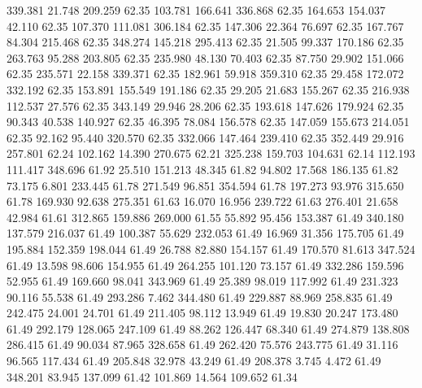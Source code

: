  339.381   21.748  209.259        62.35
 103.781  166.641  336.868        62.35
 164.653  154.037   42.110        62.35
 107.370  111.081  306.184        62.35
 147.306   22.364   76.697        62.35
 167.767   84.304  215.468        62.35
 348.274  145.218  295.413        62.35
  21.505   99.337  170.186        62.35
 263.763   95.288  203.805        62.35
 235.980   48.130   70.403        62.35
  87.750   29.902  151.066        62.35
 235.571   22.158  339.371        62.35
 182.961   59.918  359.310        62.35
  29.458  172.072  332.192        62.35
 153.891  155.549  191.186        62.35
  29.205   21.683  155.267        62.35
 216.938  112.537   27.576        62.35
 343.149   29.946   28.206        62.35
 193.618  147.626  179.924        62.35
  90.343   40.538  140.927        62.35
  46.395   78.084  156.578        62.35
 147.059  155.673  214.051        62.35
  92.162   95.440  320.570        62.35
 332.066  147.464  239.410        62.35
 352.449   29.916  257.801        62.24
 102.162   14.390  270.675        62.21
 325.238  159.703  104.631        62.14
 112.193  111.417  348.696        61.92
  25.510  151.213   48.345        61.82
  94.802   17.568  186.135        61.82
  73.175    6.801  233.445        61.78
 271.549   96.851  354.594        61.78
 197.273   93.976  315.650        61.78
 169.930   92.638  275.351        61.63
  16.070   16.956  239.722        61.63
 276.401   21.658   42.984        61.61
 312.865  159.886  269.000        61.55
  55.892   95.456  153.387        61.49
 340.180  137.579  216.037        61.49
 100.387   55.629  232.053        61.49
  16.969   31.356  175.705        61.49
 195.884  152.359  198.044        61.49
  26.788   82.880  154.157        61.49
 170.570   81.613  347.524        61.49
  13.598   98.606  154.955        61.49
 264.255  101.120   73.157        61.49
 332.286  159.596   52.955        61.49
 169.660   98.041  343.969        61.49
  25.389   98.019  117.992        61.49
 231.323   90.116   55.538        61.49
 293.286    7.462  344.480        61.49
 229.887   88.969  258.835        61.49
 242.475   24.001   24.701        61.49
 211.405   98.112   13.949        61.49
  19.830   20.247  173.480        61.49
 292.179  128.065  247.109        61.49
  88.262  126.447   68.340        61.49
 274.879  138.808  286.415        61.49
  90.034   87.965  328.658        61.49
 262.420   75.576  243.775        61.49
  31.116   96.565  117.434        61.49
 205.848   32.978   43.249        61.49
 208.378    3.745    4.472        61.49
 348.201   83.945  137.099        61.42
 101.869   14.564  109.652        61.34
